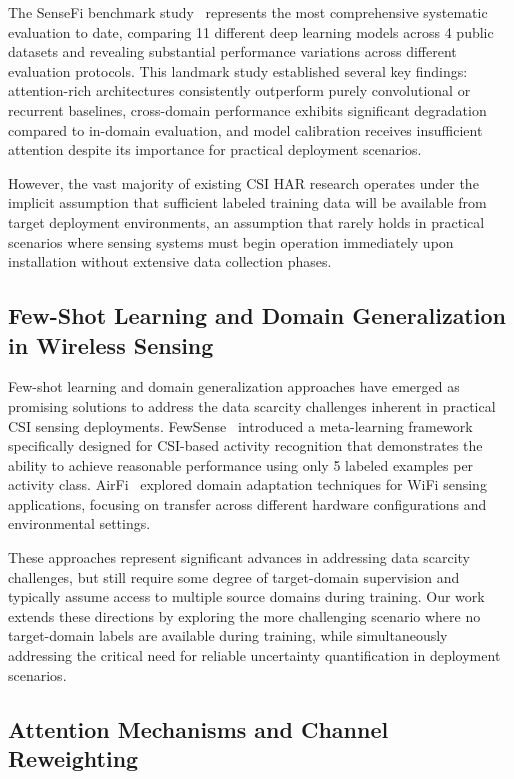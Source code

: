 \documentclass[journal]{IEEEtran}
\begin{document}
The SenseFi benchmark study~\cite{yang2023sensefi} represents the most comprehensive systematic evaluation to date, comparing 11 different deep learning models across 4 public datasets and revealing substantial performance variations across different evaluation protocols. This landmark study established several key findings: attention-rich architectures consistently outperform purely convolutional or recurrent baselines, cross-domain performance exhibits significant degradation compared to in-domain evaluation, and model calibration receives insufficient attention despite its importance for practical deployment scenarios.

However, the vast majority of existing CSI HAR research operates under the implicit assumption that sufficient labeled training data will be available from target deployment environments, an assumption that rarely holds in practical scenarios where sensing systems must begin operation immediately upon installation without extensive data collection phases.

\subsection{Few-Shot Learning and Domain Generalization in Wireless Sensing}

Few-shot learning and domain generalization approaches have emerged as promising solutions to address the data scarcity challenges inherent in practical CSI sensing deployments. FewSense~\cite{fewsense2022} introduced a meta-learning framework specifically designed for CSI-based activity recognition that demonstrates the ability to achieve reasonable performance using only 5 labeled examples per activity class. AirFi~\cite{airfi2022} explored domain adaptation techniques for WiFi sensing applications, focusing on transfer across different hardware configurations and environmental settings.

These approaches represent significant advances in addressing data scarcity challenges, but still require some degree of target-domain supervision and typically assume access to multiple source domains during training. Our work extends these directions by exploring the more challenging scenario where no target-domain labels are available during training, while simultaneously addressing the critical need for reliable uncertainty quantification in deployment scenarios.

\subsection{Attention Mechanisms and Channel Reweighting}
\end{document}
